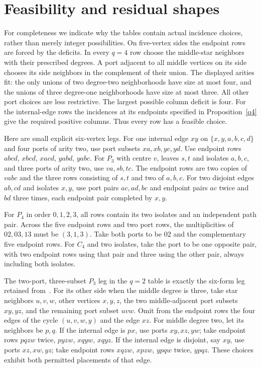 \documentclass[11pt]{article}
\begin{document}
\section{Feasibility and residual shapes}

For completeness we indicate why the tables contain actual incidence
choices, rather than merely integer possibilities. On five-vertex sides
the endpoint rows are forced by the deficits. In every $q=4$ row choose
the middle-star neighbors with their prescribed degrees. A port adjacent
to all middle vertices on its side chooses its side neighbors in the
complement of their union. The displayed arities fit: the only unions
of two degree-two neighborhoods have size at most four, and the unions
of three degree-one neighborhoods have size at most three. All other
port choices are less restrictive. The largest possible column deficit
is four. For the internal-edge rows the incidences at its endpoints
specified in Proposition~\ref{q4} give the required positive columns.
Thus every row has a feasible choice.

Here are small explicit six-vertex legs. For one internal edge $xy$ on
$\{x,y,a,b,c,d\}$ and four ports of arity two, use port subsets
$xa,xb,yc,yd$. Use endpoint rows $abcd$, $xbcd$, $xacd$, $yabd$, $yabc$.
For $P_3$ with centre $v$, leaves $s,t$ and isolates $a,b,c$, and three
ports of arity two, use $va,sb,tc$. The endpoint rows are two copies
of $vabc$ and the three rows consisting of $s,t$ and two of $a,b,c$.
For two disjoint edges $ab,cd$ and isolates $x,y$, use port pairs
$ac,ad,bc$ and endpoint pairs $ac$ twice and $bd$ three times, each
endpoint pair completed by $x,y$.

For $P_4$ in order $0,1,2,3$, all rows contain its two isolates and
an independent path pair. Across the five endpoint rows and two port
rows, the multiplicities of $02,03,13$ must be $(3,1,3)$.
Take both ports to be $02$ and the complementary five endpoint rows.
For $C_4$ and two isolates, take the port to be one opposite pair,
with two endpoint rows using that pair and three using the other pair,
always including both isolates.

The two-port, three-subset $P_3$ leg in the $q=2$ table is exactly the
six-form leg retained from~\cite{middle}. For its other side when the
middle degree is three, take star neighbors $u,v,w$, other vertices
$x,y,z$, the two middle-adjacent port subsets $xy,yz$, and the remaining
port subset $uvw$. Omit from the endpoint rows the four edges of the
cycle $(u,v,w,y)$ and the edge $xz$. For middle degree two, let its
neighbors be $p,q$. If the internal edge is $px$, use ports $xy,xz,yw$;
take endpoint rows $pqzw$ twice, $pyzw$, $xqyw$, $xqyz$.
If the internal edge is disjoint, say $xy$, use ports $xz,xw,yz$;
take endpoint rows $xqzw$, $xpzw$, $ypqw$ twice, $ypqz$.
These choices exhibit both permitted placements of that edge.
\end{document}
